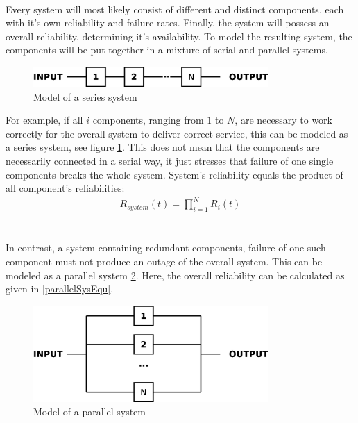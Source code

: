 \\
Every system will most likely consist of different and distinct components, each with it's own reliability and failure rates. Finally, the system
will possess an overall reliability, determining it's availability. To model the resulting system, the components will be put together in a mixture of
serial and parallel systems.
\begin{figure}
    \centering
    \includegraphics[width=0.8\textwidth]{figures/seriesSystem.eps}
    \caption{Model of a series system}
    \label{fig:serSys}
\end{figure}
For example, if all $i$ components, ranging from $1$ to $N$, are necessary to work correctly for the overall system to deliver correct service, this can be modeled as
a series system, see figure \ref{fig:serSys}. This does not mean that the components are necessarily connected in a serial way, it just stresses that failure
of one single components breaks the whole system. System's reliability equals the product of all component's reliabilities:
\begin{align}
R_{system}(t) = \prod_{i=1}^{N} R_{i}(t) 
\end{align}
\\
\\
In contrast, a system containing redundant components, failure of one such component must not produce an outage of the overall system. This can be modeled as
a parallel system \ref{fig:parallelSys}. Here, the overall reliability can be calculated as given in \ref{parallelSysEqu}.
\begin{figure}
    \centering
    \includegraphics[width=0.8\textwidth]{figures/parallelSys.eps}
    \caption{Model of a parallel system}
    \label{fig:parallelSys}
\end{figure}

